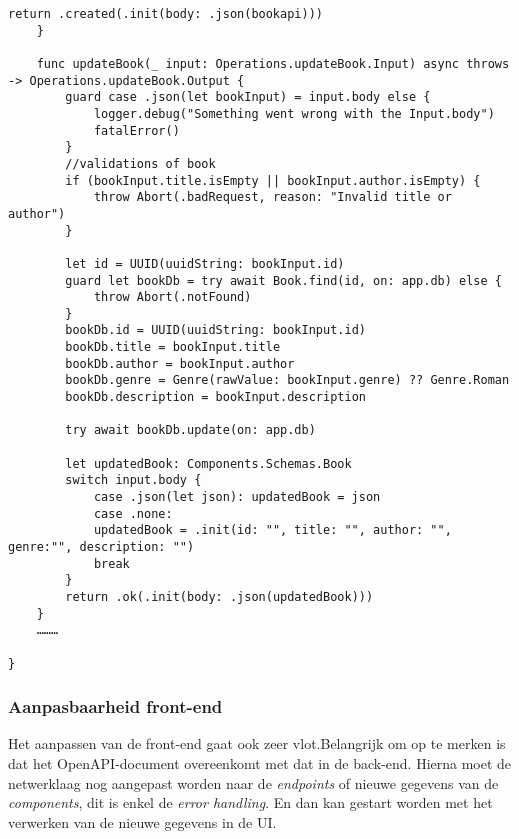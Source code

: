 \begin{lstlisting}[caption=handler file]
        return .created(.init(body: .json(bookapi)))
    }
    
    func updateBook(_ input: Operations.updateBook.Input) async throws -> Operations.updateBook.Output {
        guard case .json(let bookInput) = input.body else {
            logger.debug("Something went wrong with the Input.body")
            fatalError()
        }
        //validations of book
        if (bookInput.title.isEmpty || bookInput.author.isEmpty) {
            throw Abort(.badRequest, reason: "Invalid title or author")
        }
        
        let id = UUID(uuidString: bookInput.id)
        guard let bookDb = try await Book.find(id, on: app.db) else {
            throw Abort(.notFound)
        }
        bookDb.id = UUID(uuidString: bookInput.id)
        bookDb.title = bookInput.title
        bookDb.author = bookInput.author
        bookDb.genre = Genre(rawValue: bookInput.genre) ?? Genre.Roman
        bookDb.description = bookInput.description
        
        try await bookDb.update(on: app.db)
        
        let updatedBook: Components.Schemas.Book
        switch input.body {
            case .json(let json): updatedBook = json
            case .none:
            updatedBook = .init(id: "", title: "", author: "", genre:"", description: "")
            break
        }
        return .ok(.init(body: .json(updatedBook)))
    }
    ………
    
}

\end{lstlisting}

\subsubsection{Aanpasbaarheid front-end}
Het aanpassen van de front-end gaat ook zeer vlot.Belangrijk om op te merken is dat het OpenAPI-document overeenkomt met dat in de back-end. Hierna moet de netwerklaag nog aangepast worden naar de \textit{endpoints} of nieuwe gegevens van de \textit{components}, dit is enkel de \textit{error handling}. En dan kan gestart worden met het verwerken van de nieuwe gegevens in de UI.

